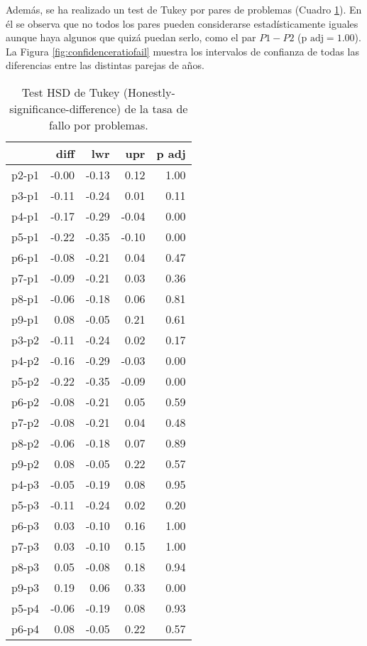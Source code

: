 Además, se ha realizado un test de Tukey por pares de problemas (Cuadro \ref{tab:Tukeyfailratio}). En él se observa que no todos los pares pueden considerarse estadísticamente iguales aunque haya algunos que quizá puedan serlo, como el par $P1-P2$ ($\text{p adj} = 1.00$). La Figura \ref{fig:confidenceratiofail} muestra los intervalos de confianza de todas las diferencias entre las distintas parejas de años.

\begin{table}[H]
\centering
\caption{Test HSD de Tukey (Honestly-significance-difference) de la tasa de fallo por problemas.}
\label{tab:Tukeyfailratio}
\begin{tabular}{rrrrr}
  \hline
 & diff & lwr & upr & p adj \\ 
  \hline
p2-p1 & -0.00 & -0.13 & 0.12 & 1.00 \\ 
  p3-p1 & -0.11 & -0.24 & 0.01 & 0.11 \\ 
  p4-p1 & -0.17 & -0.29 & -0.04 & 0.00 \\ 
  p5-p1 & -0.22 & -0.35 & -0.10 & 0.00 \\ 
  p6-p1 & -0.08 & -0.21 & 0.04 & 0.47 \\ 
  p7-p1 & -0.09 & -0.21 & 0.03 & 0.36 \\ 
  p8-p1 & -0.06 & -0.18 & 0.06 & 0.81 \\ 
  p9-p1 & 0.08 & -0.05 & 0.21 & 0.61 \\ 
  p3-p2 & -0.11 & -0.24 & 0.02 & 0.17 \\ 
  p4-p2 & -0.16 & -0.29 & -0.03 & 0.00 \\ 
  p5-p2 & -0.22 & -0.35 & -0.09 & 0.00 \\ 
  p6-p2 & -0.08 & -0.21 & 0.05 & 0.59 \\ 
  p7-p2 & -0.08 & -0.21 & 0.04 & 0.48 \\ 
  p8-p2 & -0.06 & -0.18 & 0.07 & 0.89 \\ 
  p9-p2 & 0.08 & -0.05 & 0.22 & 0.57 \\ 
  p4-p3 & -0.05 & -0.19 & 0.08 & 0.95 \\ 
  p5-p3 & -0.11 & -0.24 & 0.02 & 0.20 \\ 
  p6-p3 & 0.03 & -0.10 & 0.16 & 1.00 \\ 
  p7-p3 & 0.03 & -0.10 & 0.15 & 1.00 \\ 
  p8-p3 & 0.05 & -0.08 & 0.18 & 0.94 \\ 
  p9-p3 & 0.19 & 0.06 & 0.33 & 0.00 \\ 
  p5-p4 & -0.06 & -0.19 & 0.08 & 0.93 \\ 
  p6-p4 & 0.08 & -0.05 & 0.22 & 0.57 \\ 

\end{tabular}
\end{table}
